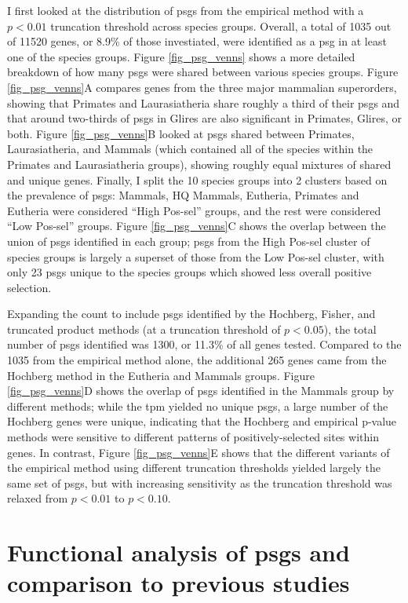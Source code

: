 I first looked at the distribution of \acp{psg} from the empirical
method with a $p<0.01$ truncation threshold across species
groups. Overall, a total of 1035 out of 11520 genes, or 8.9\% of those
investiated, were identified as a \ac{psg} in at least one of the
species groups. Figure \ref{fig_psg_venns} shows a more detailed
breakdown of how many \acp{psg} were shared between various species
groups. Figure \ref{fig_psg_venns}A compares genes from the three
major mammalian superorders, showing that Primates and Laurasiatheria
share roughly a third of their \acp{psg} and that around two-thirds of
\acp{psg} in Glires are also significant in Primates, Glires, or
both. Figure \ref{fig_psg_venns}B looked at \acp{psg} shared between
Primates, Laurasiatheria, and Mammals (which contained all of the
species within the Primates and Laurasiatheria groups), showing
roughly equal mixtures of shared and unique genes. Finally, I split
the 10 species groups into 2 clusters based on the prevalence of
\acp{psg}: Mammals, HQ Mammals, Eutheria, Primates and Eutheria were
considered ``High Pos-sel'' groups, and the rest were considered ``Low
Pos-sel'' groups. Figure \ref{fig_psg_venns}C shows the overlap
between the union of \acp{psg} identified in each group; \acp{psg}
from the High Pos-sel cluster of species groups is largely a superset
of those from the Low Pos-sel cluster, with only 23 \acp{psg} unique
to the species groups which showed less overall positive selection.

Expanding the count to include \acp{psg} identified by the Hochberg,
Fisher, and truncated product methods (at a truncation threshold of
$p<0.05$), the total number of \acp{psg} identified was 1300, or
11.3\% of all genes tested. Compared to the 1035 from the empirical
method alone, the additional 265 genes came from the Hochberg method
in the Eutheria and Mammals groups. Figure \ref{fig_psg_venns}D shows
the overlap of \acp{psg} identified in the Mammals group by different
methods; while the \ac{tpm} yielded no unique \acp{psg}, a large
number of the Hochberg genes were unique, indicating that the Hochberg
and empirical p-value methods were sensitive to different patterns of
positively-selected sites within genes. In contrast, Figure
\ref{fig_psg_venns}E shows that the different variants of the
empirical method using different truncation thresholds yielded largely
the same set of \acp{psg}, but with increasing sensitivity as the
truncation threshold was relaxed from $p<0.01$ to $p<0.10$.

\section{Functional analysis of \acp{psg} and comparison to previous studies}

